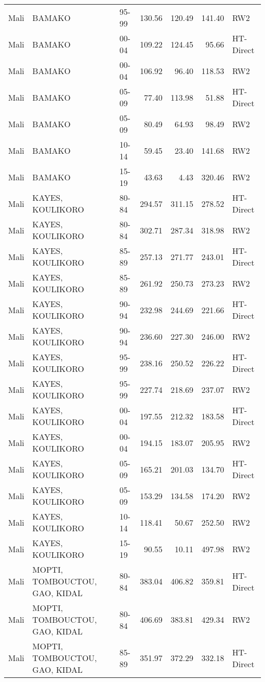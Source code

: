 \begin{longtable}{lllrrrl}
  Mali & BAMAKO & 95-99 & 130.56 & 120.49 & 141.40 & RW2 \\ 
  Mali & BAMAKO & 00-04 & 109.22 & 124.45 & 95.66 & HT-Direct \\ 
  Mali & BAMAKO & 00-04 & 106.92 & 96.40 & 118.53 & RW2 \\ 
  Mali & BAMAKO & 05-09 & 77.40 & 113.98 & 51.88 & HT-Direct \\ 
  Mali & BAMAKO & 05-09 & 80.49 & 64.93 & 98.49 & RW2 \\ 
  Mali & BAMAKO & 10-14 & 59.45 & 23.40 & 141.68 & RW2 \\ 
  Mali & BAMAKO & 15-19 & 43.63 & 4.43 & 320.46 & RW2 \\ 
  Mali & KAYES, KOULIKORO & 80-84 & 294.57 & 311.15 & 278.52 & HT-Direct \\ 
  Mali & KAYES, KOULIKORO & 80-84 & 302.71 & 287.34 & 318.98 & RW2 \\ 
  Mali & KAYES, KOULIKORO & 85-89 & 257.13 & 271.77 & 243.01 & HT-Direct \\ 
  Mali & KAYES, KOULIKORO & 85-89 & 261.92 & 250.73 & 273.23 & RW2 \\ 
  Mali & KAYES, KOULIKORO & 90-94 & 232.98 & 244.69 & 221.66 & HT-Direct \\ 
  Mali & KAYES, KOULIKORO & 90-94 & 236.60 & 227.30 & 246.00 & RW2 \\ 
  Mali & KAYES, KOULIKORO & 95-99 & 238.16 & 250.52 & 226.22 & HT-Direct \\ 
  Mali & KAYES, KOULIKORO & 95-99 & 227.74 & 218.69 & 237.07 & RW2 \\ 
  Mali & KAYES, KOULIKORO & 00-04 & 197.55 & 212.32 & 183.58 & HT-Direct \\ 
  Mali & KAYES, KOULIKORO & 00-04 & 194.15 & 183.07 & 205.95 & RW2 \\ 
  Mali & KAYES, KOULIKORO & 05-09 & 165.21 & 201.03 & 134.70 & HT-Direct \\ 
  Mali & KAYES, KOULIKORO & 05-09 & 153.29 & 134.58 & 174.20 & RW2 \\ 
  Mali & KAYES, KOULIKORO & 10-14 & 118.41 & 50.67 & 252.50 & RW2 \\ 
  Mali & KAYES, KOULIKORO & 15-19 & 90.55 & 10.11 & 497.98 & RW2 \\ 
  Mali & MOPTI, TOMBOUCTOU, GAO, KIDAL & 80-84 & 383.04 & 406.82 & 359.81 & HT-Direct \\ 
  Mali & MOPTI, TOMBOUCTOU, GAO, KIDAL & 80-84 & 406.69 & 383.81 & 429.34 & RW2 \\ 
  Mali & MOPTI, TOMBOUCTOU, GAO, KIDAL & 85-89 & 351.97 & 372.29 & 332.18 & HT-Direct \\ 

\end{longtable}
